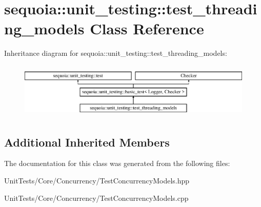 \hypertarget{classsequoia_1_1unit__testing_1_1test__threading__models}{}\section{sequoia\+::unit\+\_\+testing\+::test\+\_\+threading\+\_\+models Class Reference}
\label{classsequoia_1_1unit__testing_1_1test__threading__models}
Inheritance diagram for sequoia\+::unit\+\_\+testing\+::test\+\_\+threading\+\_\+models\+:\begin{figure}[H]
\begin{center}
\leavevmode
\includegraphics[height=2.666667cm]{classsequoia_1_1unit__testing_1_1test__threading__models}
\end{center}
\end{figure}
\subsection*{Additional Inherited Members}


The documentation for this class was generated from the following files\+:\begin{DoxyCompactItemize}
\item 
Unit\+Tests/\+Core/\+Concurrency/Test\+Concurrency\+Models.\+hpp\item 
Unit\+Tests/\+Core/\+Concurrency/Test\+Concurrency\+Models.\+cpp\end{DoxyCompactItemize}
